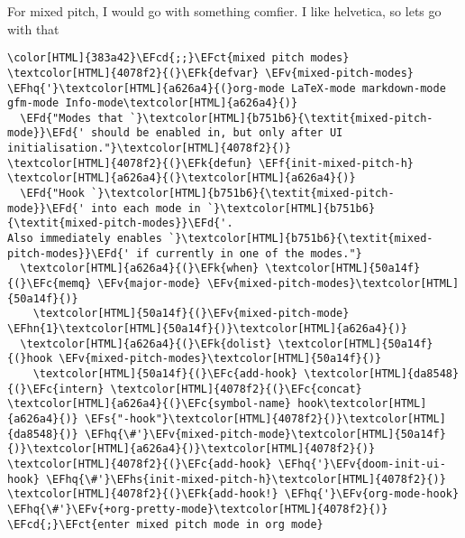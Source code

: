\documentclass{scrartcl}
\newcommand{\EFk}[1]{\textcolor{EFk}{#1}} %
\newcommand{\EFd}[1]{\textcolor{EFd}{\textit{#1}}} %
\newcommand{\EFs}[1]{\textcolor{EFs}{#1}} %
\newcommand{\EFct}[1]{\textcolor{EFct}{#1}} %
\newcommand{\EFc}[1]{\textcolor{EFc}{#1}} %
\newcommand{\EFv}[1]{\textcolor{EFv}{#1}} %
\newcommand{\EFf}[1]{\textcolor{EFf}{#1}} %
\newcommand{\EFcd}[1]{\textcolor{EFcd}{#1}} %
\newcommand{\EFhn}[1]{\textcolor{EFhn}{\textbf{#1}}} %
\newcommand{\EFhq}[1]{\textcolor{EFhq}{#1}} %
\newcommand{\EFhs}[1]{\textcolor{EFhs}{#1}} %
\begin{document}
For mixed pitch, I would go with something comfier. I like helvetica, so lets go with that
\begin{Code}
\begin{Verbatim}[]
\color[HTML]{383a42}\EFcd{;;}\EFct{mixed pitch modes}
\textcolor[HTML]{4078f2}{(}\EFk{defvar} \EFv{mixed-pitch-modes} \EFhq{'}\textcolor[HTML]{a626a4}{(}org-mode LaTeX-mode markdown-mode gfm-mode Info-mode\textcolor[HTML]{a626a4}{)}
  \EFd{"Modes that `}\textcolor[HTML]{b751b6}{\textit{mixed-pitch-mode}}\EFd{' should be enabled in, but only after UI initialisation."}\textcolor[HTML]{4078f2}{)}
\textcolor[HTML]{4078f2}{(}\EFk{defun} \EFf{init-mixed-pitch-h} \textcolor[HTML]{a626a4}{(}\textcolor[HTML]{a626a4}{)}
  \EFd{"Hook `}\textcolor[HTML]{b751b6}{\textit{mixed-pitch-mode}}\EFd{' into each mode in `}\textcolor[HTML]{b751b6}{\textit{mixed-pitch-modes}}\EFd{'.
Also immediately enables `}\textcolor[HTML]{b751b6}{\textit{mixed-pitch-modes}}\EFd{' if currently in one of the modes."}
  \textcolor[HTML]{a626a4}{(}\EFk{when} \textcolor[HTML]{50a14f}{(}\EFc{memq} \EFv{major-mode} \EFv{mixed-pitch-modes}\textcolor[HTML]{50a14f}{)}
    \textcolor[HTML]{50a14f}{(}\EFv{mixed-pitch-mode} \EFhn{1}\textcolor[HTML]{50a14f}{)}\textcolor[HTML]{a626a4}{)}
  \textcolor[HTML]{a626a4}{(}\EFk{dolist} \textcolor[HTML]{50a14f}{(}hook \EFv{mixed-pitch-modes}\textcolor[HTML]{50a14f}{)}
    \textcolor[HTML]{50a14f}{(}\EFc{add-hook} \textcolor[HTML]{da8548}{(}\EFc{intern} \textcolor[HTML]{4078f2}{(}\EFc{concat} \textcolor[HTML]{a626a4}{(}\EFc{symbol-name} hook\textcolor[HTML]{a626a4}{)} \EFs{"-hook"}\textcolor[HTML]{4078f2}{)}\textcolor[HTML]{da8548}{)} \EFhq{\#'}\EFv{mixed-pitch-mode}\textcolor[HTML]{50a14f}{)}\textcolor[HTML]{a626a4}{)}\textcolor[HTML]{4078f2}{)}
\textcolor[HTML]{4078f2}{(}\EFc{add-hook} \EFhq{'}\EFv{doom-init-ui-hook} \EFhq{\#'}\EFhs{init-mixed-pitch-h}\textcolor[HTML]{4078f2}{)}
\textcolor[HTML]{4078f2}{(}\EFk{add-hook!} \EFhq{'}\EFv{org-mode-hook} \EFhq{\#'}\EFv{+org-pretty-mode}\textcolor[HTML]{4078f2}{)} \EFcd{;}\EFct{enter mixed pitch mode in org mode}


\end{Verbatim}
\end{Code}
\end{document}
